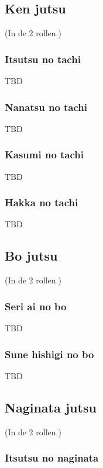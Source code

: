 \subsection{Ken jutsu}
(In de 2 rollen.)

\subsubsection{Itsutsu no tachi}

TBD

\subsubsection{Nanatsu no tachi}

TBD

\subsubsection{Kasumi no tachi}

TBD

\subsubsection{Hakka no tachi}

TBD

\subsection{Bo jutsu}
(In de 2 rollen.)

\subsubsection{Seri ai no bo}

TBD

\subsubsection{Sune hishigi no bo}

TBD

\subsection{Naginata jutsu}
(In de 2 rollen.)

\subsubsection{Itsutsu no naginata}

